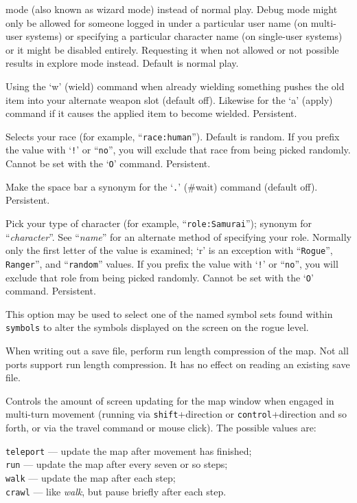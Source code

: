 mode (also known as wizard mode) instead of normal play.
Debug mode might only be allowed for someone logged in under a particular
user name (on multi-user systems) or specifying a particular character
name (on single-user systems) or it might be disabled entirely.  Requesting
it when not allowed or not possible results in explore mode instead.
Default is normal play.
\item[\ib{pushweapon}]
Using the `w' (wield) command when already wielding
something pushes the old item into your alternate weapon slot (default off).
Likewise for the `a' (apply) command if it causes the applied item to
become wielded.  Persistent.
\item[\ib{race}]
Selects your race (for example, ``{\tt race:human}'').  Default is random.
If you prefix the value with `{\tt !}' or ``{\tt no}'', you will
exclude that race from being picked randomly.
Cannot be set with the `{\tt O}' command.  Persistent.
\item[\ib{rest\verb+_+on\verb+_+space}]
Make the space bar a synonym for the `{\tt .}' (\#wait) command (default off).
Persistent.
\item[\ib{role}]
Pick your type of character (for example, ``{\tt role:Samurai}'');
synonym for ``{\it character\/}''.  See ``{\it name\/}'' for an alternate method
of specifying your role.  Normally only the first letter of the
value is examined; `r' is an exception with ``{\tt Rogue}'', {\tt Ranger}'',
and ``{\tt random}'' values.
If you prefix the value with `{\tt !}' or ``{\tt no}'', you will
exclude that role from being picked randomly.
Cannot be set with the `{\tt O}' command.  Persistent.
\item[\ib{roguesymset}]
This option may be used to select one of the named symbol sets found within
{\tt symbols} to alter the symbols displayed on the screen on the
rogue level.
\item[\ib{rlecomp}]
When writing out a save file, perform run length compression of the map.
Not all ports support run length compression. It has no
effect on reading an existing save file.
\item[\ib{runmode}]
Controls the amount of screen updating for the map window when engaged
in multi-turn movement (running via {\tt shift}+direction
or {\tt control}+direction
and so forth, or via the travel command or mouse click).
The possible values are:

{\tt teleport} --- update the map after movement has finished;\\
{\tt run} --- update the map after every seven or so steps;\\
{\tt walk} --- update the map after each step;\\
{\tt crawl} --- like {\it walk\/}, but pause briefly after each step.

